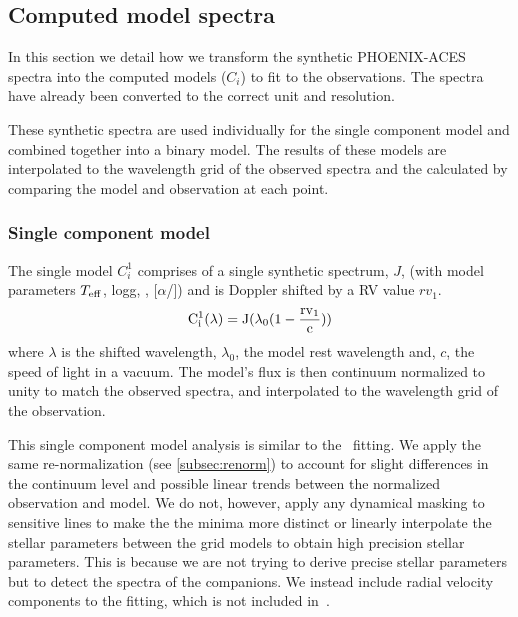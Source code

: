 \subsection{Computed model spectra}
\label{models}
In this section we detail how we transform the synthetic {PHOENIX-ACES} spectra into the computed models (\(C_i\)) to fit to the observations.
The spectra have already been converted to the correct unit and resolution.

These synthetic spectra are used individually for the single component model and combined together into a binary model.
The results of these models are interpolated to the wavelength grid of the observed spectra and the \textchisquared{} calculated by comparing the model and observation at each point.


\subsubsection{Single component model}
\label{subsubsec:single-model}
The single model \(C^{1}_{i}\) comprises of a single synthetic spectrum, \(J\), (with model parameters \(T_{\mathrm{eff}}{}\), logg, \feh{}, [\(\alpha\)/]) and is Doppler shifted by a {RV} value \({rv}_1\).
\begin{equation}
\rm C^{1}_{i}(\lambda) = J(\lambda_0(1-\frac{{rv}_1}{c}))
\end{equation}
where \(\lambda\) is the shifted wavelength, \(\lambda_0\), the model rest wavelength and, \(c\), the speed of light in a vacuum.
The model's flux is then continuum normalized to unity to match the observed spectra, and interpolated to the wavelength grid of the observation.

This single component model analysis is similar to the~\citet{passegger_fundamental_2016} \textchisquared{} fitting.
We apply the same re-normalization (see \cref{subsec:renorm}) to account for slight differences in the continuum level and possible linear trends between the normalized observation and model.
We do not, however, apply any dynamical masking to sensitive lines to make the the \textchisquared{} minima more distinct or linearly interpolate the stellar parameters between the grid models to obtain high precision stellar parameters.
This is because we are not trying to derive precise stellar parameters but to detect the spectra of the companions.
We instead include radial velocity components to the \textchisquared{} fitting, which is not included in~\citet{passegger_fundamental_2016}.



